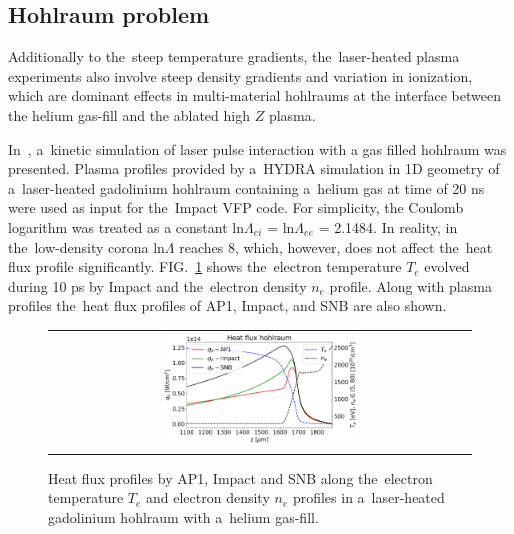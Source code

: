 \documentclass[
 aps,
 jmp,
 amsmath,amssymb,
 twocolumn,
]{revtex4-1}
\newcommand{\figref}[1]{FIG.~\ref{#1}}
\newcommand{\figscale}{0.48}
\newcommand{\Zbar}{Z}
\newcommand{\Te}{T_e}
\newcommand{\ed}{n_e}
\newcommand{\lnc}{\text{ln}\Lambda}
\begin{document}
 %

\subsection{Hohlraum problem}
Additionally to the~steep temperature gradients, the~laser-heated plasma 
experiments also involve steep density gradients and variation in ionization,
which are dominant effects in multi-material hohlraums
at the interface between the helium gas-fill and 
the ablated high $\Zbar$ plasma.

In~\cite{Brodrick_PoP2017}, a~kinetic simulation of laser pulse interaction 
with a gas filled hohlraum was presented. 
Plasma profiles provided by a~HYDRA simulation in 1D
geometry of a~laser-heated gadolinium hohlraum containing a~helium 
gas at time of 20 ns were used as input for the~Impact 
\cite{Kingham_JCP2004} VFP code.  
For simplicity, the Coulomb logarithm was treated as a
constant $\lnc_{ei}$ = $\lnc_{ee}$ = 2.1484. In reality, in the~low-density 
corona $\lnc$ reaches 8, which, however, does not affect the~heat flux profile 
significantly. 
\figref{fig:Gd_VFP_10ps_heatflux} shows the~electron temperature $\Te$ 
evolved during 10 ps by Impact and the~electron density $\ed$ profile.
Along with plasma profiles the~heat flux profiles
of AP1, Impact, and SNB are also shown.  

\begin{figure}[htb]
  \begin{center}
    \begin{tabular}{c}
      \includegraphics[width=\figscale\textwidth]{C7_GdHohlraum_heatflux.png} 
    \end{tabular}
  \caption{
  Heat flux profiles by AP1, Impact and SNB along 
  the~electron temperature $\Te$ and electron density $\ed$
  profiles in a~laser-heated gadolinium hohlraum 
  with a~helium gas-fill.
  }
  \label{fig:Gd_VFP_10ps_heatflux}
  \end{center} 
\end{figure}
\end{document}
